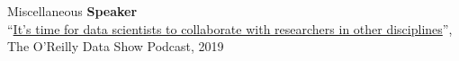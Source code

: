 \documentclass{resume} %
\begin{document}
%

\begin{rSection}{Miscellaneous}
\textbf{Speaker}\\
``\href{https://www.oreilly.com/radar/its-time-for-data-scientists-to-collaborate-with-researchers-in-other-disciplines/}{It’s time for data scientists to collaborate with researchers in other disciplines}'', The O'Reilly Data Show Podcast, 2019
\end{rSection}

%
%
%



\end{document}
